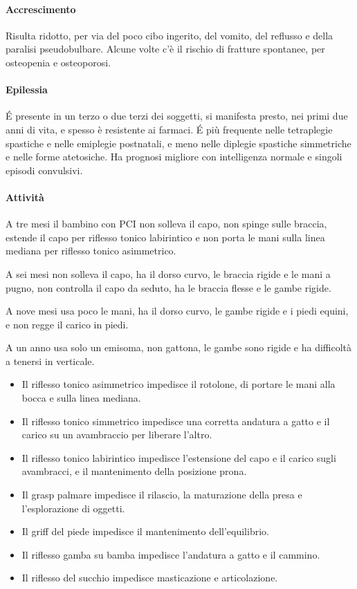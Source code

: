 \paragraph{Accrescimento}
Risulta ridotto, per via del poco cibo ingerito, del vomito, del reflusso e della paralisi pseudobulbare. Alcune volte c'è il rischio di
fratture spontanee, per osteopenia e osteoporosi.

\paragraph{Epilessia}
\'E presente in un terzo o due terzi dei soggetti, si manifesta presto, nei primi due anni di vita, e spesso è resistente ai farmaci.
\'E più frequente nelle tetraplegie spastiche e nelle emiplegie postnatali, e meno nelle diplegie spastiche simmetriche e nelle forme
atetosiche. Ha prognosi migliore con intelligenza normale e singoli episodi convulsivi.

\paragraph{Attività}
A tre mesi il bambino con PCI non solleva il capo, non spinge sulle braccia, estende il capo per riflesso tonico labirintico e non porta
le mani sulla linea mediana per riflesso tonico asimmetrico.

A sei mesi non solleva il capo, ha il dorso curvo, le braccia rigide e le mani a pugno, non controlla il capo da seduto, ha le braccia
flesse e le gambe rigide. 

A nove mesi usa poco le mani, ha il dorso curvo, le gambe rigide e i piedi equini, e non regge il carico in piedi.

A un anno usa solo un emisoma, non gattona, le gambe sono rigide e ha difficoltà a tenersi in verticale. 
\begin{itemize}
\item Il riflesso tonico asimmetrico impedisce il rotolone, di portare le mani alla bocca e sulla linea mediana.
\item Il riflesso tonico simmetrico impedisce una corretta andatura a gatto e il carico su un avambraccio per liberare l'altro.
\item Il riflesso tonico labirintico impedisce l'estensione del capo e il carico sugli avambracci, e il mantenimento della posizione
prona. 
\item Il grasp palmare impedisce il rilascio, la maturazione della presa e l'esplorazione di oggetti.
\item Il griff del piede impedisce il mantenimento dell'equilibrio.
\item Il riflesso gamba su bamba impedisce l'andatura a gatto e il cammino.
\item Il riflesso del succhio impedisce masticazione e articolazione.
\end{itemize}


